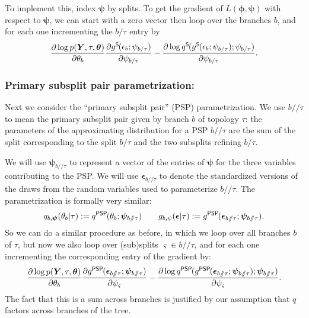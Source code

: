 \documentclass{article}
\newcommand{\psp}{\slash\!\!\slash}
\newcommand{\qSplit}{q^\textsf{S}\hspace{-1pt}}
\newcommand{\gSplit}{g^\textsf{S}\hspace{-1pt}}
\newcommand{\qPSP}{q^\textsf{PSP}\hspace{-1pt}}
\newcommand{\gPSP}{g^\textsf{PSP}\hspace{-1pt}}
\begin{document}
To implement this, index $\bm\psi$ by splits.
To get the gradient of $L(\bm\phi, \bm\psi)$ with respect to $\bm\psi$, we can start with a zero vector then loop over the branches $b$, and for each one incrementing the $b \slash \tau$ entry by
\begin{equation*}
    \frac{\partial \log p(\bm{Y}, \tau, \bm\theta)}{\partial \theta_b}
    \frac{\partial \gSplit(\epsilon_b; \psi_{b \slash \tau})}{\partial \psi_{b \slash \tau}}
    - \frac{\partial \log \qSplit(\gSplit(\epsilon_b; \psi_{b \slash \tau}); \psi_{b \slash \tau})}{\partial \psi_{b \slash \tau}}.
\end{equation*}


\subsubsection*{Primary subsplit pair parametrization:}
Next we consider the ``primary subsplit pair'' (PSP) parametrization.
We use $b \psp \tau$ to mean the primary subsplit pair given by branch $b$ of topology $\tau$: the parameters of the approximating distribution for a PSP $b \psp \tau$ are the sum of the split corresponding to the split $b \slash \tau$ and the two subsplits refining $b \slash \tau$.

We will use $\bm\psi_{b \psp \tau}$ to represent a vector of the entries of $\bm\psi$ for the three variables contributing to the PSP.
We will use $\bm\epsilon_{b \psp \tau}$ to denote the standardized versions of the draws from the random variables used to parameterize $b \psp \tau$.
The parametrization is formally very similar:
\[
q_{b, \bm{\psi}}(\theta_b | \tau) := \qPSP(\theta_b; \bm\psi_{b \psp \tau})
\qquad
g_{b,\psi}(\bm\epsilon | \tau) := \gPSP(\bm\epsilon_{b \psp \tau}; \bm\psi_{b \psp \tau}).
\]
So we can do a similar procedure as before, in which we loop over all branches $b$ of $\tau$, but now we also loop over (sub)splits $\varsigma \in b \psp \tau$, and for each one incrementing the corresponding entry of the gradient by:
\begin{equation}
    \frac{\partial \log p(\bm{Y}, \tau, \bm\theta)}{\partial \theta_b}
    \frac{\partial \gPSP(\bm\epsilon_{b \psp \tau}; \bm\psi_{b \psp \tau})}{\partial \psi_{\varsigma}}
    - \frac{\partial \log \qPSP(\gPSP(\bm\epsilon_{b \psp \tau}; \bm\psi_{b \psp \tau}); \bm\psi_{b \psp \tau})}{\partial \psi_{\varsigma}}.
    \label{eq:PSPgradComponent}
\end{equation}
The fact that this is a sum across branches is justified by our assumption that $q$ factors across branches of the tree.
\end{document}
